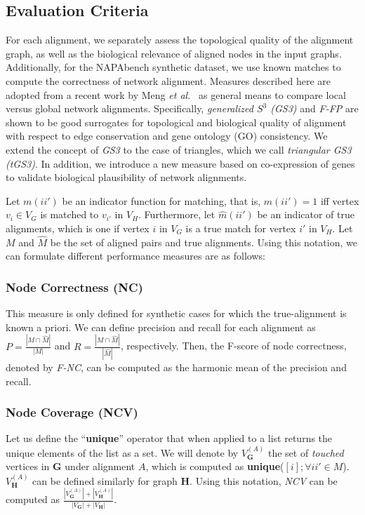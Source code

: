 \documentclass[10pt, journal, compsoc, final]{IEEEtran}
\newcommand{\bs}[1]{\boldsymbol{#1}}
\newcommand{\Graph}[1]{\mathit{\mathbf{\bs{#1}}}}
\newcommand{\Set}[1]{\mathit{#1}}
\begin{document}
\subsection{Evaluation Criteria}
\label{sec:eval_criteria}

For each alignment, we separately assess the topological quality of the alignment graph, as well as
the biological relevance of aligned nodes in the input graphs.  Additionally, for the NAPAbench synthetic dataset, we use known matches to compute the correctness of network alignment. Measures described here are adopted from a recent work by Meng \textit{et al.}~\cite{Meng2015} as general means to compare local versus global network alignments. Specifically, \textit{generalized $S^{3}$ (GS3)} and \textit{F-FP} are shown to be good surrogates for topological and biological quality of alignment with respect to edge conservation and gene ontology (GO) consistency.
We extend the concept of \textit{GS3} to the case of triangles, which we call \textit{triangular GS3 (tGS3)}. In addition, we introduce a new measure based on co-expression of genes to validate biological plausibility of network alignments. 


Let $m(ii')$ be an indicator function for matching, that is, $m(ii')=1$ iff vertex $v_i \in V_G$ is matched to $v_{i'}$ in $V_H$. Furthermore, let $\hat{m}(ii')$ be an indicator of true alignments, which is one if vertex $i$ in $V_G$ is a true match for vertex $i'$ in $V_H$. Let $\Set{M}$ and $\Set{\hat{M}}$ be the set of aligned pairs and true alignments. Using this notation, we can formulate different performance measures are as follows:


\subsubsection{Node Correctness (NC)}

This measure is only defined for synthetic cases for which the true-alignment is known a priori. We can define precision and recall for each alignment as $P=\frac{|\Set{M} \cap \Set{\hat{M}}|}{|\Set{M}|}$ and $R=\frac{|\Set{M} \cap \Set{\hat{M}}|}{|\Set{\hat{M}}|}$, respectively. Then, the F-score of node correctness, denoted by \textit{F-NC}, can be computed as the harmonic mean of the precision and recall.


\subsubsection{Node Coverage (NCV)}
Let us define the ``\textbf{unique}'' operator that when applied to a list returns the unique elements of the list as a set. We will denote by $V_{\Graph{G}}^{(A)}$ the set of \textit{touched} vertices in $\Graph{G}$ under alignment $A$, which is computed as \textbf{unique}($[i]; \forall ii' \in \Set{M}$). $V_{\Graph{H}}^{(A)}$ can be defined similarly for graph $\Graph{H}$. Using this notation, \textit{NCV} can be computed as $\frac{|V_{\Graph{G}}^{(A)}| + |V_{\Graph{H}}^{(A)}|}{|V_{\Graph{G}}| + |V_{\Graph{H}}|}$.
\end{document}
